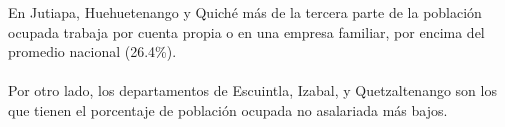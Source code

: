 En Jutiapa, Huehuetenango y  Quiché más de la tercera parte de la población ocupada trabaja por cuenta propia o en una empresa familiar, por encima del promedio nacional (26.4\%). \\\\
Por otro lado,  los departamentos de Escuintla, Izabal,  y Quetzaltenango son los que tienen el porcentaje de población ocupada no asalariada más bajos. 
